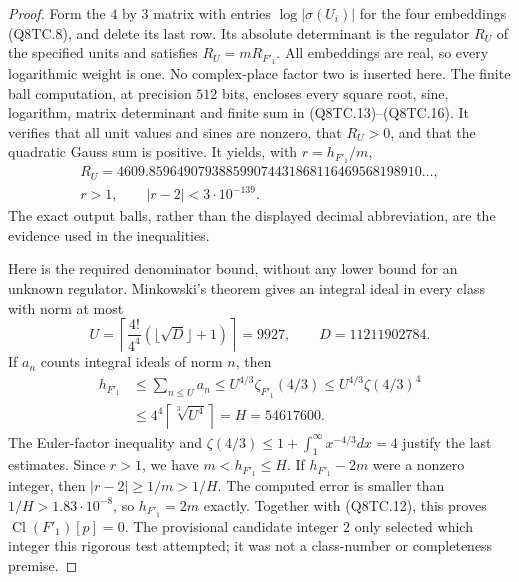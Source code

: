 \begin{proof}
Form the $4$ by $3$ matrix with entries
$\log|\sigma(U_i)|$ for the four embeddings (Q8TC.8), and delete
its last row.  Its absolute determinant is the regulator $R_U$
of the specified units and satisfies $R_U=mR_{F'_1}$.
All embeddings are real, so every logarithmic weight is one.
No complex-place factor two is inserted here.
The finite ball computation, at precision $512$ bits, encloses
every square root, sine, logarithm, matrix determinant and finite
sum in (Q8TC.13)--(Q8TC.16).
It verifies that all unit values and sines are nonzero, that
$R_U>0$, and that the quadratic Gauss sum is positive.
It yields, with $r=h_{F'_1}/m$,
\[
 \begin{gathered}
 R_U=4609.859649079388599074431868116469568198910\ldots,\\
 r>1,\qquad |r-2|<3\cdot10^{-139}.
 \end{gathered}
 \tag{Q8TC.17}
\]
The exact output balls, rather than the displayed decimal
abbreviation, are the evidence used in the inequalities.

Here is the required denominator bound, without any lower bound
for an unknown regulator.
Minkowski's theorem gives an integral ideal in every class with
norm at most
\[
 U=\left\lceil\frac{4!}{4^4}
                  (\lfloor\sqrt D\rfloor+1)\right\rceil=9927,
                    \qquad D=11211902784.
 \tag{Q8TC.18}
\]
If $a_n$ counts integral ideals of norm $n$, then
\[
 \begin{aligned}
 h_{F'_1}&\leq\sum_{n\leq U}a_n
       \leq U^{4/3}\zeta_{F'_1}(4/3)
       \leq U^{4/3}\zeta(4/3)^4\\
       &\leq 4^4\left\lceil\sqrt[3]{U^4}\right\rceil
         =H=54617600.
 \end{aligned}
 \tag{Q8TC.19}
\]
The Euler-factor inequality and
$\zeta(4/3)\leq1+\int_1^\infty x^{-4/3}dx=4$
justify the last estimates.
Since $r>1$, we have $m<h_{F'_1}\leq H$.
If $h_{F'_1}-2m$ were a nonzero integer, then
$|r-2|\geq1/m>1/H$.
The computed error is smaller than $1/H>1.83\cdot10^{-8}$,
so $h_{F'_1}=2m$ exactly.
Together with (Q8TC.12), this proves
$\operatorname{Cl}(F'_1)[p]=0$.
The provisional candidate integer $2$ only selected which
integer this rigorous test attempted; it was not a class-number
or completeness premise.


\end{proof}
